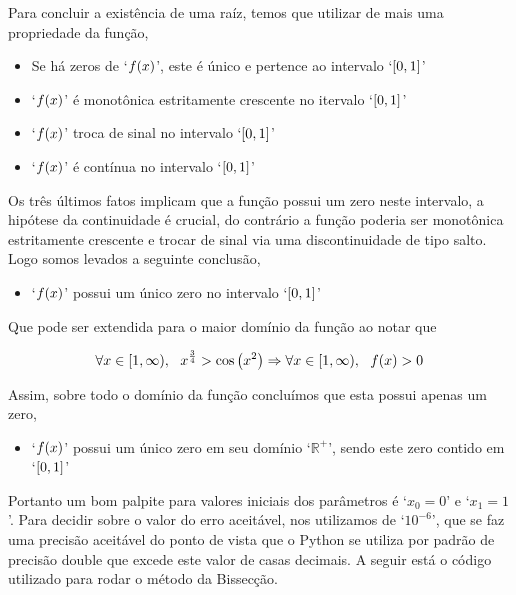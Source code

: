 \documentclass[twoside]{amsart}
\numberwithin{equation}{section}
\begin{document}
Para concluir a existência de uma raíz, temos que utilizar de mais uma 
propriedade da função,

\begin{itemize}
    \item Se há zeros de `$f\qty(x)$', este é único e pertence ao intervalo `$\qty[0,1]$'
    \item `$f\qty(x)$' é monotônica estritamente crescente no itervalo `$\qty[0,1]$'
    \item `$f\qty(x)$' troca de sinal no intervalo `$\qty[0,1]$'
    \item `$f\qty(x)$' é contínua no intervalo `$\qty[0,1]$'
\end{itemize}

Os três últimos fatos implicam que a função possui um zero neste intervalo, 
a hipótese da continuidade é crucial, do contrário a função poderia ser 
monotônica estritamente crescente e trocar de sinal via uma discontinuidade 
de tipo salto. Logo somos levados a seguinte conclusão,

\begin{itemize}
    \item `$f\qty(x)$' possui um único zero no intervalo `$\qty[0,1]$'
\end{itemize}

Que pode ser extendida para o maior domínio da função ao notar que 

\begin{align}
    \forall x\in [1,\infty), \ \ x^{\frac34}>\cos\qty(x^2)\Rightarrow \forall x\in [1,\infty),\ \  f\qty(x)>0
\end{align}

Assim, sobre todo o domínio da função concluímos que esta possui apenas 
um zero,

\begin{itemize}
    \item `$f\qty(x)$' possui um único zero em seu domínio `$\mathbb R^+$', sendo este zero contido em `$\qty[0,1]$'
\end{itemize}

Portanto um bom palpite para valores iniciais dos parâmetros é `$x_0=0$' 
e `$x_1=1$'. Para decidir sobre o valor do erro aceitável, nos utilizamos 
de `$10^{-6}$', que se faz uma precisão aceitável do ponto de vista que o 
Python se utiliza por padrão de precisão double que excede este valor de 
casas decimais. A seguir está o código utilizado para rodar o método da Bissecção.
\end{document}
